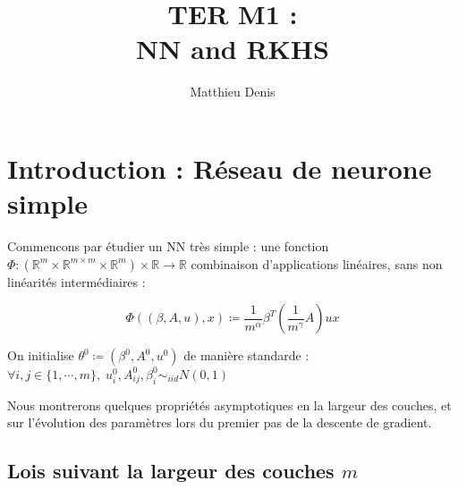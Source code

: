 \documentclass[a4paper, 11pt, french]{article}
\title{TER M1 : \\ NN and RKHS}
\author{Matthieu Denis}
\begin{document}
	
	\maketitle
	\newpage
	
	\tableofcontents
	\newpage
	
	\section{Introduction : Réseau de neurone simple}
	
	Commencons par étudier un NN très simple : une fonction
	$\Phi : (\mathbb{R}^m \times \mathbb{R}^{m \times m} \times \mathbb{R}^m) \times \mathbb{R} \to \mathbb{R}$ combinaison d'applications linéaires, sans non linéarités  intermédiaires  :
	
	\[ \Phi ((\beta, A, u), x) \coloneqq \frac{1}{m^{\alpha}} \beta^T
		 \left( \frac{1}{m^{\gamma}} A \right) u x \]
		 
	On initialise $\theta^0 \coloneqq (\beta^0, A^0, u^0)$ de manière standarde : 
	$ \forall i,j \in \{1, \cdots, m\} , \; u_i^0, A_{ij}^0, \beta_i^0 \sim_{iid} N(0, 1)$
	
	Nous montrerons quelques propriétés asymptotiques en la largeur des couches, et sur l'évolution des paramètres lors du premier pas de la descente de gradient.
	
	\subsection{Lois suivant la largeur des couches $m$}
	
\end{document}
